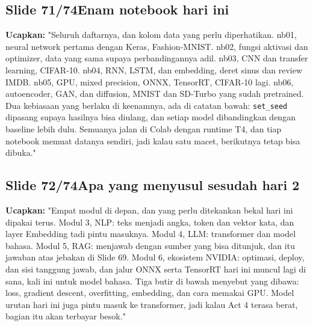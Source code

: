 \documentclass[11pt]{article}
\renewcommand{\framebox}[1]{\colorbox{acc!15}{\textcolor{acc}{\textbf{#1}}}}
\begin{document}
\subsection*{\framebox{Slide 71/74}\quad Enam notebook hari ini}
\textbf{Ucapkan:} "Seluruh daftarnya, dan kolom data yang perlu diperhatikan. nb01, neural network pertama dengan Keras, Fashion-MNIST. nb02, fungsi aktivasi dan optimizer, data yang sama supaya perbandingannya adil. nb03, CNN dan transfer learning, CIFAR-10. nb04, RNN, LSTM, dan embedding, deret sinus dan review IMDB. nb05, GPU, mixed precision, ONNX, TensorRT, CIFAR-10 lagi. nb06, autoencoder, GAN, dan diffusion, MNIST dan SD-Turbo yang sudah pretrained. Dua kebiasaan yang berlaku di keenamnya, ada di catatan bawah: \texttt{set\_seed} dipasang supaya hasilnya bisa diulang, dan setiap model dibandingkan dengan baseline lebih dulu. Semuanya jalan di Colab dengan runtime T4, dan tiap notebook memuat datanya sendiri, jadi kalau satu macet, berikutnya tetap bisa dibuka."\\[2pt]

\subsection*{\framebox{Slide 72/74}\quad Apa yang menyusul sesudah hari 2}
\textbf{Ucapkan:} "Empat modul di depan, dan yang perlu ditekankan bekal hari ini dipakai terus. Modul 3, NLP: teks menjadi angka, token dan vektor kata, dan layer Embedding tadi pintu masuknya. Modul 4, LLM: transformer dan model bahasa. Modul 5, RAG: menjawab dengan sumber yang bisa ditunjuk, dan itu jawaban atas jebakan di Slide 69. Modul 6, ekosistem NVIDIA: optimasi, deploy, dan sisi tanggung jawab, dan jalur ONNX serta TensorRT hari ini muncul lagi di sana, kali ini untuk model bahasa. Tiga butir di bawah menyebut yang dibawa: loss, gradient descent, overfitting, embedding, dan cara memakai GPU. Model urutan hari ini juga pintu masuk ke transformer, jadi kalau Act 4 terasa berat, bagian itu akan terbayar besok."\\[2pt]
\end{document}
